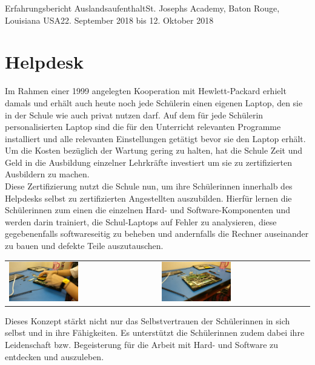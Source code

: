 \documentclass[oneside,openany,headings=optiontotoc,11pt,numbers=noenddot]{article}
\begin{document}
\begin{worksheet}{Erfahrungsbericht Auslandsaufenthalt}{St. Joseph\grq{}s Academy, Baton Rouge, Louisiana USA}{22. September 2018 bis 12. Oktober 2018}
		\section{Helpdesk}
		Im Rahmen einer 1999 angelegten Kooperation mit Hewlett-Packard erhielt damals und erhält auch heute noch jede Schülerin einen eigenen Laptop, den sie in der Schule wie auch privat nutzen darf. Auf dem für jede Schülerin personalisierten Laptop sind die für den Unterricht relevanten Programme installiert und alle relevanten Einstellungen getätigt bevor sie den Laptop erhält.\\
		Um die Kosten bezüglich der Wartung gering zu halten, hat die Schule Zeit und Geld in die Ausbildung einzelner Lehrkräfte investiert um sie zu zertifizierten Ausbildern zu machen.\\
		Diese Zertifizierung nutzt die Schule nun, um ihre Schülerinnen innerhalb des Helpdesks selbst zu zertifizierten Angestellten auszubilden. Hierfür lernen die Schülerinnen zum einen die einzelnen Hard- und Software-Komponenten und werden darin trainiert, die Schul-Laptops auf Fehler zu analysieren, diese gegebenenfalls softwareseitig zu beheben und andernfalls die Rechner auseinander zu bauen und defekte Teile auszutauschen.\\
		\begin{center}
			\begin{tabularx}{\textwidth}{XX}
				\includegraphics[width=0.48\textwidth]{../99_Bilder/00_HD.jpg} & \includegraphics[width=0.48\textwidth]{../99_Bilder/01_HD.jpg}
			\end{tabularx}
		\end{center}
		Dieses Konzept stärkt nicht nur das Selbstvertrauen der Schülerinnen in sich selbst und in ihre Fähigkeiten. Es unterstützt die Schülerinnen zudem dabei ihre Leidenschaft bzw. Begeisterung für die Arbeit mit Hard- und Software zu entdecken und auszuleben.\\

\end{worksheet}
\end{document}
